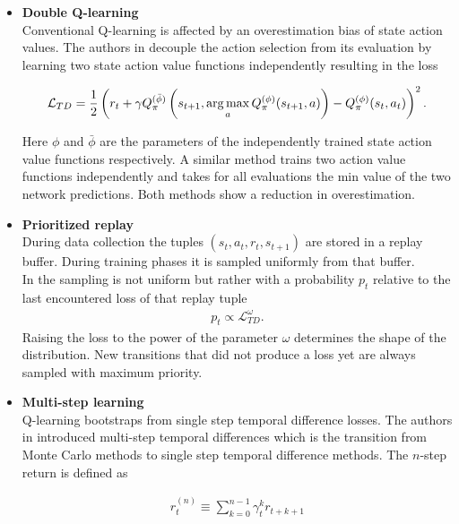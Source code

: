 \begin{itemize}
	\item \textbf{Double Q-learning} \label{text:doublQ}\\
	Conventional Q-learning is affected by an overestimation bias of state action values. The authors in \cite{DBLP:journals/corr/HasseltGS15} decouple the action selection from its evaluation by learning two state action value functions independently resulting in the loss
	
	\begin{align}
		\mathcal{L}_{TD} = \frac{1}{2} \left(r_{t} + \gamma Q_{\pi}^{(\bar{\phi})} \left( s_{t+1}, \operatorname*{arg\,max}_{a}Q_{\pi}^{(\phi)}(s_{t+1}, a) \right) - Q_{\pi}^{(\phi)}(s_t, a_t)\right)^2\text{.}
	\end{align}
	
	Here $\phi$ and $\bar{\phi}$ are the parameters of the independently trained state action value functions respectively. A similar method trains two action value functions independently and takes for all evaluations the min value of the two network predictions. Both methods show a reduction in overestimation.
	
	\item \textbf{Prioritized replay}\\
	During data collection the tuples $(s_t, a_t, r_{t}, s_{t+1})$ are stored in a replay buffer. During training phases it is sampled uniformly from that buffer.\\
	In \cite{schaul2015prioritized} the sampling is not uniform but rather with a probability $p_t$ relative to the last encountered loss of that replay tuple
	\begin{align}
		p_t \propto \mathcal{L}_{TD} ^ \omega \text{.}
	\end{align}
	Raising the loss to the power of the parameter $\omega$ determines the shape of the distribution. New transitions that did not produce a loss yet are always sampled with maximum priority.
	
	\item \textbf{Multi-step learning}\\
	Q-learning bootstraps from single step temporal difference losses. The authors in \cite{SBQL} introduced multi-step temporal differences which is the transition from Monte Carlo methods to single step temporal difference methods. The $n$-step return is defined as 
	
	\begin{align}
		r_t^{(n)} \equiv \sum_{k=0}^{n-1} \gamma_t^{k} r_{t+k+1}
	\end{align}
	

\end{itemize}
